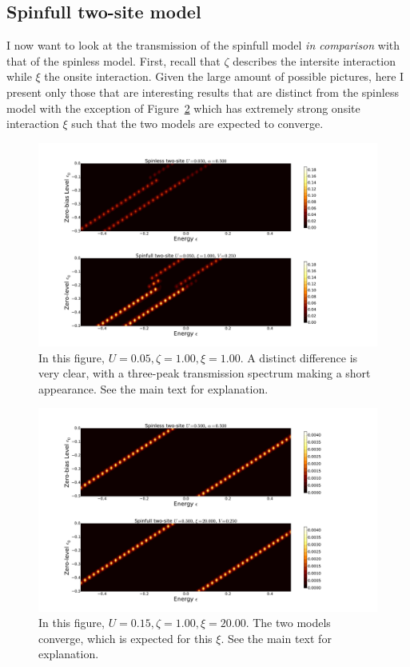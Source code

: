 \subsection{Spinfull two-site model}
I now want to look at the transmission of the spinfull model \emph{in comparison} with that of the spinless model. First, recall that $\zeta$ describes the intersite interaction while $\xi$ the onsite interaction. Given the large amount of possible pictures, here I present only those that are interesting results that are distinct from the spinless model with the exception of Figure~\ref{fig:transmap34} which has extremely strong onsite interaction $\xi$ such that the two models are expected to converge. 
  
\begin{figure}[htb]
    \centering
    \includegraphics[height=.38\textheight]{pdf/map/transmap_u1_k2.pdf}
    \caption{In this figure, $U=0.05, \zeta=1.00, \xi=1.00$. A distinct difference is very clear, with a three-peak transmission spectrum making a short appearance. See the main text for explanation.}
    \label{fig:transmap12}
\end{figure} 
\begin{figure}[htb]
    \centering
    \includegraphics[height=.38\textheight]{pdf/map/transmap_u3_k4.pdf}
    \caption{In this figure, $U=0.15, \zeta=1.00, \xi=20.00$. The two models converge, which is expected for this $\xi$. See the main text for explanation.}
    \label{fig:transmap34}
\end{figure}

